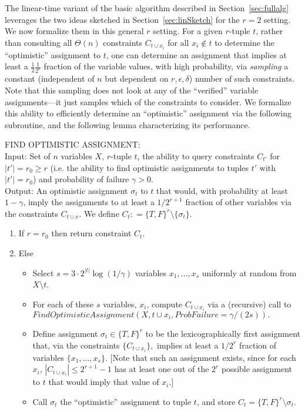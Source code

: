\documentclass[final,12pt]{colt2018}
\newcommand{\eps}{\epsilon}
\begin{document}
The linear-time variant of the basic algorithm described in Section~\ref{sec:fullalg} leverages the two ideas sketched in Section~\ref{sec:linSketch} for the $r=2$ setting.  We now formalize them in this general $r$ setting.  For a given $r$-tuple $t$, rather than consulting all $\Theta(n)$ constraints $C_{t \cup x_i}$ for all $x_i \not \in t$ to determine the ``optimistic'' assignment to $t$, one can determine an assignment that implies at least a $\frac{1}{2}\frac{1}{2^r}$ fraction of the variable values, with high probability, via \emph{sampling} a constant  (independent of $n$ but dependent on $r, \eps, \delta$) number of such constraints.  Note that this sampling does not look at any of the ``verified'' variable assignments---it just samples which of the constraints to consider.   We formalize this ability to efficiently determine an ``optimistic'' assignment via the following subroutine, and the following lemma characterizing its performance.

\vspace{-.4cm}\begin{algorithm}[H]
FIND OPTIMISTIC ASSIGNMENT:\\
Input: Set of $n$ variables $X$, $r$-tuple $t$, the ability to query constraints $C_{t'}$ for $|t'|=r_0 \ge r$ (i.e. the ability to find optimistic assignments to tuples $t'$ with $|t'| = r_0$) and probability of failure $\gamma > 0$.\\
Output: An optimistic assignment $\sigma_t$ to $t$ that would, with probability at least $1-\gamma$, imply the assignments to at least a $1/2^{r+1}$ fraction of other variables via the constraints $C_{t \cup x}$.    We define $C_t : = \{T,F\}^r \setminus \{\sigma_t\}.$
\begin{enumerate}
\item If $r=r_0$ then return constraint $C_t$.
\item Else
\begin{itemize}
\item Select $s = 3\cdot 2^{|t|} \log (1/\gamma)$ variables $x_1,\ldots, x_s$ uniformly at random from $X \setminus t$.
\item For each of these $s$ variables, $x_i$, compute $C_{t \cup x_i}$ via a (recursive) call to $FindOptimisticAssignment(X, t\cup x_i, ProbFailure = \gamma/(2s)).$
\item Define assignment $\sigma_t \in \{T,F\}^r$ to be the lexicographically first assignment that, via the constraints $\{C_{t \cup x_i} \},$ implies at least a $1/2^r$ fraction of variables $\{x_1,\ldots,x_s\}$.  [Note that such an assignment exists, since for each $x_i$,  $|C_{t \cup x_i}| \le 2^{r+1}-1$ has at least one out of the $2^r$ possible assignment to $t$ that would imply that value of $x_i$.]
\item Call $\sigma_t$ the ``optimistic'' assignment to tuple $t$, and store $C_t = \{T,F\}^r \setminus \sigma_t.$
\end{itemize}
\end{enumerate}
\end{algorithm}
\end{document}
